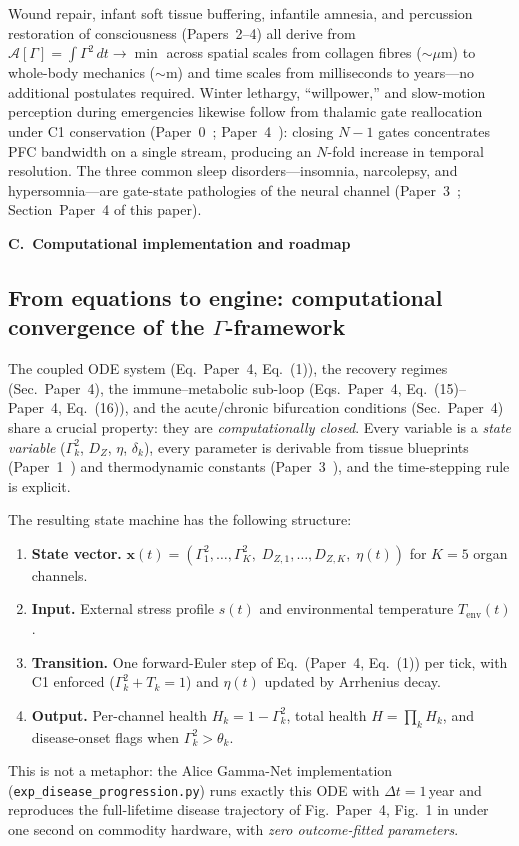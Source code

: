 \documentclass[aps,pre,twocolumn,superscriptaddress,floatfix]{revtex4-2}
\begin{document}
Wound repair, infant soft tissue buffering, infantile
amnesia, and percussion restoration of consciousness
(Papers~2--4) all derive from $\mathcal{A}[\Gamma]
= \int \Gamma^2\,dt \to \min$ across spatial scales
from collagen fibres ($\sim\mu$m) to whole-body
mechanics ($\sim$m) and time scales from milliseconds
to years---no additional postulates required.
Winter lethargy, ``willpower,'' and slow-motion
perception during emergencies likewise follow from
thalamic gate reallocation under C1 conservation
(Paper~0~\cite{Paper0}; Paper~4~\cite{Paper4}):
closing $N-1$ gates concentrates PFC bandwidth on a
single stream, producing an $N$-fold increase in
temporal resolution.
The three common sleep disorders---insomnia, narcolepsy,
and hypersomnia---are gate-state pathologies of the
neural channel
(Paper~3~\cite{Paper3};
Section~Paper~4 of this paper).

\medskip\noindent\textbf{\large C.~Computational implementation and roadmap}
\medskip

\subsection{From equations to engine:
  computational convergence of the $\Gamma$-framework}
\label{sec:computational-convergence}

The coupled ODE system
(Eq.~Paper~4, Eq.~(1)),
the recovery regimes (Sec.~Paper~4),
the immune--metabolic sub-loop
(Eqs.~Paper~4, Eq.~(15)--Paper~4, Eq.~(16)), and
the acute/chronic bifurcation conditions
(Sec.~Paper~4) share a crucial
property: they are \emph{computationally closed}.
Every variable is a \emph{state variable}
($\Gamma_k^2$, $D_Z$, $\eta$, $\delta_k$),
every parameter is derivable from tissue blueprints
(Paper~1~\cite{Paper1}) and thermodynamic constants
(Paper~3~\cite{Paper3}), and the time-stepping
rule is explicit.

The resulting state machine has the following structure:
\begin{enumerate}
  \item \textbf{State vector.}
    $\mathbf{x}(t) = (\Gamma_1^2,\ldots,\Gamma_K^2,\;
    D_{Z,1},\ldots,D_{Z,K},\;\eta(t))$
    for $K = 5$ organ channels.
  \item \textbf{Input.}
    External stress profile $s(t)$ and
    environmental temperature $T_{\text{env}}(t)$.
  \item \textbf{Transition.}
    One forward-Euler step of
    Eq.~(Paper~4, Eq.~(1)) per tick,
    with C1 enforced ($\Gamma_k^2 + T_k = 1$)
    and $\eta(t)$ updated by Arrhenius decay.
  \item \textbf{Output.}
    Per-channel health $H_k = 1 - \Gamma_k^2$,
    total health $H = \prod_k H_k$,
    and disease-onset flags when
    $\Gamma_k^2 > \theta_k$.
\end{enumerate}
This is not a metaphor: the Alice Gamma-Net
implementation (\texttt{exp\_disease\_progression.py})
runs exactly this ODE with $\Delta t = 1$\,year
and reproduces the full-lifetime disease trajectory
of Fig.~Paper~4, Fig.~1 in under
one second on commodity hardware, with
\emph{zero outcome-fitted parameters}.
\end{document}
